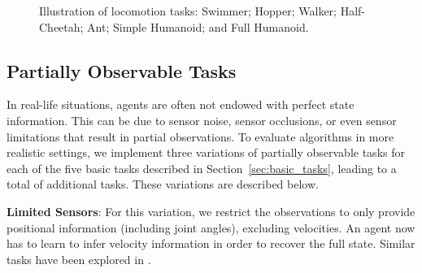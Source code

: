 \documentclass{article}
\begin{document}
\begin{figure}[!h]
\caption{Illustration of locomotion tasks:  Swimmer;  Hopper;  Walker;  Half-Cheetah;  Ant;  Simple Humanoid; and  Full Humanoid.}\label{fig:plots_locomotion_tasks}
\end{figure}


























\subsection{Partially Observable Tasks}

In real-life situations, agents are often not endowed with perfect state information. This can be due to sensor noise, sensor occlusions, or even sensor limitations that result in partial observations. To evaluate algorithms in more realistic settings, we implement three variations of partially observable tasks for each of the five basic tasks described in Section~\ref{sec:basic_tasks}, leading to a total of  additional tasks. These variations are described below.



{\bf Limited Sensors}: For this variation, we restrict the observations to only provide positional information (including joint angles), excluding velocities. An agent now has to learn to infer velocity information in order to recover the full state. Similar tasks have been explored in \citet{gomez19982, schafer2005solving, heess2015memory, wierstra2007solving}.
\end{document}
